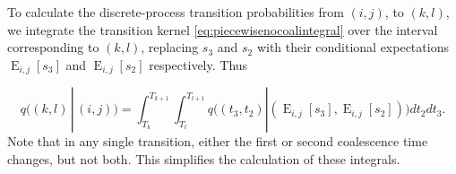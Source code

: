 \documentclass{article}
\DeclareMathOperator{\E}{E}
\begin{document}
To calculate the discrete-process transition probabilities from $(i,j)$, to
$(k,l)$, we integrate the transition kernel \eqref{eq:piecewisenocoalintegral}
over the interval corresponding to $(k,l)$, replacing $s_3$ and $s_2$ with
their conditional expectations $\E_{i,j}[s_3]$ and $\E_{i,j}[s_2]$
respectively. Thus


\begin{equation}
    q\Big((k,l)\,|\,(i,j)\Big) = 
    \int_{T_k}^{T_{k+1}}\int_{T_l}^{T_{l+1}}q\Big((t_3,t_2)|\left(\E_{i,j}[s_3],\E_{i,j}[s_2]\right)\Big)dt_2dt_3.
\end{equation}
Note that in any single transition, either the first or second coalescence time
changes, but not both. This simplifies the calculation of these integrals.
\end{document}
